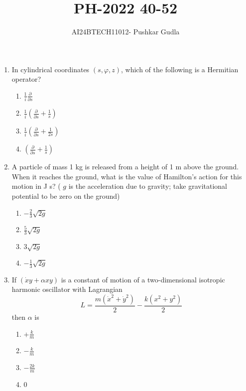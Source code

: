 \documentclass[journal,12pt,onecolumn]{IEEEtran}
\theoremstyle{remark}
\begin{document}

\vspace{3cm}

\title{\textbf{PH-2022 40-52}}
\author{AI24BTECH11012- Pushkar Gudla}
\maketitle
\bigskip

\renewcommand{\thefigure}{\theenumi}
\renewcommand{\thetable}{\theenumi}
\setlength{\columnsep}{2.5em}

\begin{enumerate}
    \item In cylindrical coordinates $(s, \varphi, z)$, which of the following is a Hermitian operator?
    \begin{enumerate}
        \item $\frac{1}{i} \frac{\partial}{\partial s}$
        \item $\frac{1}{i} \left( \frac{\partial}{\partial s} + \frac{1}{s} \right)$
        \item $\frac{1}{i} \left( \frac{\partial}{\partial s} + \frac{1}{2s} \right)$
        \item $\left( \frac{\partial}{\partial s} + \frac{1}{s} \right)$
    \end{enumerate}

    \item A particle of mass 1 kg is released from a height of 1 m above the ground. When it reaches the ground, what is the value of Hamilton's action for this motion in J s? ( $g$ is the acceleration due to gravity; take gravitational potential to be zero on the ground)
    \begin{enumerate}
        \item $-\frac{2}{3} \sqrt{2g}$
        \item $\frac{5}{3} \sqrt{2g}$
        \item $3 \sqrt{2g}$
        \item $-\frac{1}{3} \sqrt{2g}$
    \end{enumerate}
    
    \item If $(\dot{x} y + \alpha xy)$ is a constant of motion of a two-dimensional isotropic harmonic oscillator with Lagrangian
    \[
    L = \frac{m(\dot{x}^2 + \dot{y}^2)}{2} - \frac{k(x^2 + y^2)}{2}
    \]
    then $\alpha$ is
    \begin{enumerate}
        \item $+\frac{k}{m}$
        \item $-\frac{k}{m}$
        \item $-\frac{2k}{m}$
        \item 0
    \end{enumerate}


\end{enumerate}
\end{document}
